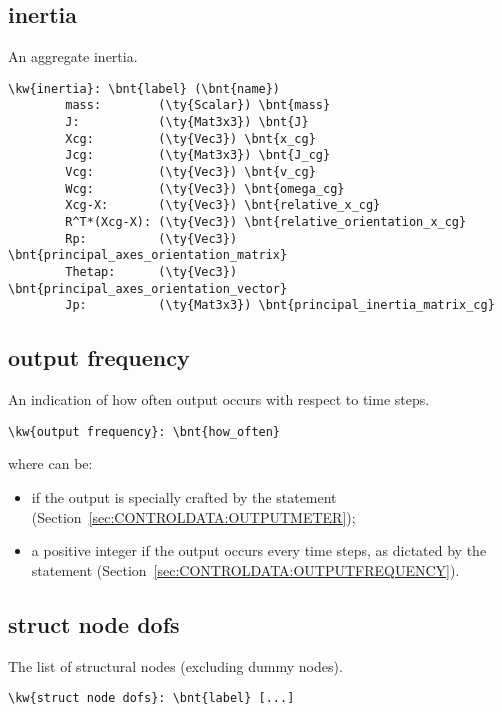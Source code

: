 \subsection{inertia}
An aggregate inertia.
\begin{Verbatim}[commandchars=\\\{\}]
    \kw{inertia}: \bnt{label} (\bnt{name})
        mass:        (\ty{Scalar}) \bnt{mass}
        J:           (\ty{Mat3x3}) \bnt{J}
        Xcg:         (\ty{Vec3}) \bnt{x_cg}
        Jcg:         (\ty{Mat3x3}) \bnt{J_cg}
        Vcg:         (\ty{Vec3}) \bnt{v_cg}
        Wcg:         (\ty{Vec3}) \bnt{omega_cg}
        Xcg-X:       (\ty{Vec3}) \bnt{relative_x_cg}
        R^T*(Xcg-X): (\ty{Vec3}) \bnt{relative_orientation_x_cg}
        Rp:          (\ty{Vec3}) \bnt{principal_axes_orientation_matrix}
        Thetap:      (\ty{Vec3}) \bnt{principal_axes_orientation_vector}
        Jp:          (\ty{Mat3x3}) \bnt{principal_inertia_matrix_cg}
\end{Verbatim}

\subsection{output frequency}
An indication of how often output occurs with respect to time steps.
\begin{Verbatim}[commandchars=\\\{\}]
\kw{output frequency}: \bnt{how_often}
\end{Verbatim}
where  can be:
\begin{itemize}
\item {} if the output is specially crafted by the
 statement (Section~\ref{sec:CONTROLDATA:OUTPUTMETER});
\item a positive integer if the output occurs every 
time steps, as dictated by the  statement
(Section~\ref{sec:CONTROLDATA:OUTPUTFREQUENCY}).
\end{itemize}

\subsection{struct node dofs}
The list of structural nodes (excluding dummy nodes).
\begin{Verbatim}[commandchars=\\\{\}]
\kw{struct node dofs}: \bnt{label} [...]
\end{Verbatim}

